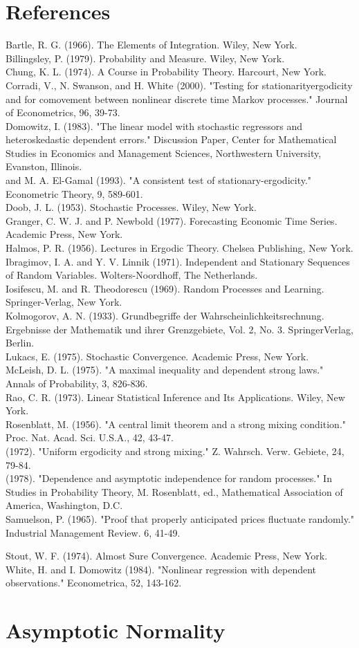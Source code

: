 \documentclass[10pt]{article}
\begin{document}
\section*{References}
Bartle, R. G. (1966). The Elements of Integration. Wiley, New York.\\
Billingsley, P. (1979). Probability and Measure. Wiley, New York.\\
Chung, K. L. (1974). A Course in Probability Theory. Harcourt, New York.\\
Corradi, V., N. Swanson, and H. White (2000). "Testing for stationarityergodicity and for comovement between nonlinear discrete time Markov processes." Journal of Econometrics, 96, 39-73.\\
Domowitz, I. (1983). "The linear model with stochastic regressors and heteroskedastic dependent errors." Discussion Paper, Center for Mathematical Studies in Economics and Management Sciences, Northwestern University, Evanston, Illinois.\\
and M. A. El-Gamal (1993). "A consistent test of stationary-ergodicity." Econometric Theory, 9, 589-601.\\
Doob, J. L. (1953). Stochastic Processes. Wiley, New York.\\
Granger, C. W. J. and P. Newbold (1977). Forecasting Economic Time Series. Academic Press, New York.\\
Halmos, P. R. (1956). Lectures in Ergodic Theory. Chelsea Publishing, New York.\\
Ibragimov, I. A. and Y. V. Linnik (1971). Independent and Stationary Sequences of Random Variables. Wolters-Noordhoff, The Netherlands.\\
Iosifescu, M. and R. Theodorescu (1969). Random Processes and Learning. Springer-Verlag, New York.\\
Kolmogorov, A. N. (1933). Grundbegriffe der Wahrscheinlichkeitsrechnung. Ergebnisse der Mathematik und ihrer Grenzgebiete, Vol. 2, No. 3. SpringerVerlag, Berlin.\\
Lukacs, E. (1975). Stochastic Convergence. Academic Press, New York.\\
McLeish, D. L. (1975). "A maximal inequality and dependent strong laws." Annals of Probability, 3, 826-836.\\
Rao, C. R. (1973). Linear Statistical Inference and Its Applications. Wiley, New York.\\
Rosenblatt, M. (1956). "A central limit theorem and a strong mixing condition." Proc. Nat. Acad. Sci. U.S.A., 42, 43-47.\\
(1972). "Uniform ergodicity and strong mixing." Z. Wahrsch. Verw. Gebiete, 24, 79-84.\\
(1978). "Dependence and asymptotic independence for random processes." In Studies in Probability Theory, M. Rosenblatt, ed., Mathematical Association of America, Washington, D.C.\\
Samuelson, P. (1965). "Proof that properly anticipated prices fluctuate randomly." Industrial Management Review. 6, 41-49.

Stout, W. F. (1974). Almost Sure Convergence. Academic Press, New York.\\
White, H. and I. Domowitz (1984). "Nonlinear regression with dependent observations." Econometrica, 52, 143-162.

\section*{Asymptotic Normality}
\end{document}
